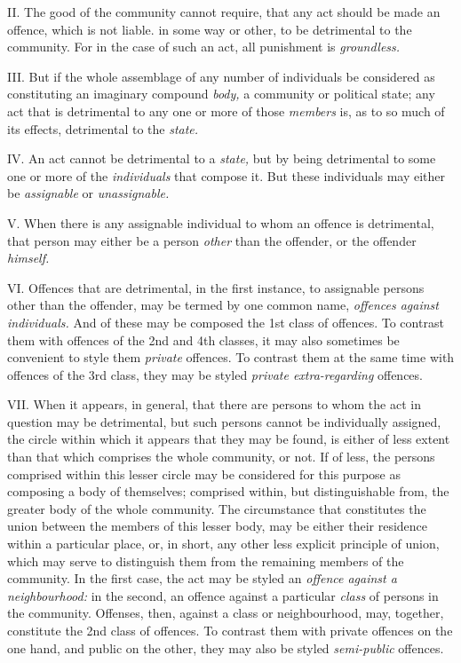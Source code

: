 \documentclass[12pt]{report}
\begin{document}
II. The good of the community cannot require, that any act should be
made an offence, which is not liable. in some way or other, to be
detrimental to the community. For in the case of such an act, all
punishment is \emph{groundless.}

III. But if the whole assemblage of any number of individuals be
considered as constituting an imaginary compound \emph{body,} a
community or political state; any act that is detrimental to any one or
more of those \emph{members} is, as to so much of its effects,
detrimental to the \emph{state.}

IV. An act cannot be detrimental to a \emph{state,} but by being
detrimental to some one or more of the \emph{individuals} that compose
it. But these individuals may either be \emph{assignable} or
\emph{unassignable.}

V. When there is any assignable individual to whom an offence is
detrimental, that person may either be a person \emph{other} than the
offender, or the offender \emph{himself.}

VI. Offences that are detrimental, in the first instance, to assignable
persons other than the offender, may be termed by one common name,
\emph{offences against individuals.} And of these may be composed the
1st class of offences. To contrast them with offences of the 2nd and 4th
classes, it may also sometimes be convenient to style them
\emph{private} offences. To contrast them at the same time with offences
of the 3rd class, they may be styled \emph{private extra-regarding}
offences.

VII. When it appears, in general, that there are persons to whom the act
in question may be detrimental, but such persons cannot be individually
assigned, the circle within which it appears that they may be found, is
either of less extent than that which comprises the whole community, or
not. If of less, the persons comprised within this lesser circle may be
considered for this purpose as composing a body of themselves; comprised
within, but distinguishable from, the greater body of the whole
community. The circumstance that constitutes the union between the
members of this lesser body, may be either their residence within a
particular place, or, in short, any other less explicit principle of
union, which may serve to distinguish them from the remaining members of
the community. In the first case, the act may be styled an \emph{offence
against a neighbourhood:} in the second, an offence against a particular
\emph{class} of persons in the community. Offenses, then, against a
class or neighbourhood, may, together, constitute the 2nd class of
offences. To contrast them with private offences on the one hand, and
public on the other, they may also be styled \emph{semi-public}
offences.
\end{document}
